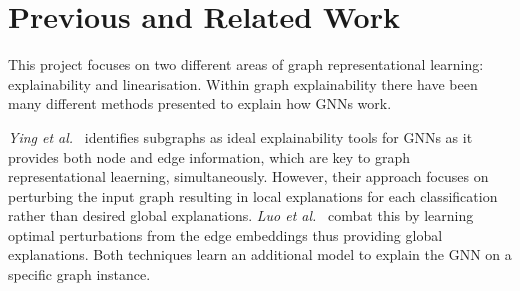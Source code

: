 %



\section{Previous and Related Work}
This project focuses on two different areas of graph representational learning: explainability and linearisation.
Within graph explainability there have been many different methods presented to explain how GNNs work.

\textit{Ying et al.}~\cite{ying2019gnnexplainer} identifies subgraphs as ideal explainability tools for GNNs as it provides both node and edge information, which are key to graph representational leaerning, simultaneously. 
However, their approach focuses on perturbing the input graph resulting in local explanations for each classification rather than desired global explanations.
\textit{Luo et al.}~\cite{luo2020parameterized} combat this by learning optimal perturbations from the edge embeddings thus providing global explanations.
Both techniques learn an additional model to explain the GNN on a specific graph instance.

